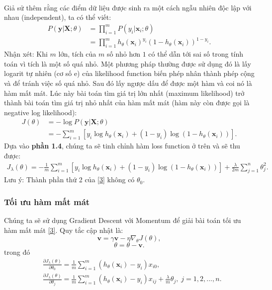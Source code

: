 \documentclass[]{article}
\begin{document}
\\
Giả sử thêm rằng các điểm dữ liệu được sinh ra một cách ngẫu nhiên độc lập với nhau (independent), ta có thể viết:
\begin{align*}
	P(\mathbf{y}|\mathbf{X}; \theta) &= \prod_{i=1}^m P(y_i| \mathbf{x}_i; \theta) \\
	&= \prod_{i=1}^m h_\theta(\textbf{x}_i)^{y_i}(1 - h_\theta(\textbf{x}_i))^{1- y_i}.
\end{align*}
Nhận xét: Khi $m$ lớn, tích của $m$ số nhỏ hơn $1$ có thể dẫn tới sai số trong tính toán vì tích là một số quá nhỏ. Một phương pháp thường được sử dụng đó là lấy logarit tự nhiên (cơ số e) của likelihood function biến phép nhân thành phép cộng và để tránh việc số quá nhỏ. Sau đó lấy ngược dấu để được một hàm và coi nó là hàm mất mát. Lúc này bài toán tìm giá trị lớn nhất (maximum likelihood) trở thành bài toán tìm giá trị nhỏ nhất của hàm mất mát (hàm này còn được gọi là negative log likelihood):
\begin{align*}
	J(\theta) &= -\log P(\mathbf{y}|\mathbf{X};\theta) \\
	&= -\sum_{i=1}^m \left[y_i \log h_\theta(\textbf{x}_i) + (1-y_i) \log (1 - h_\theta(\textbf{x}_i))\right].
\end{align*}
Dựa vào \textbf{phần 1.4}, chúng ta sẽ tinh chỉnh hàm loss function ở trên và sẽ thu được:
\begin{align}\label{3}
	J_\lambda(\theta) = -\frac{1}{m}\sum_{i=1}^m \left[y_i \log h_\theta(\textbf{x}_i) + (1-y_i) \log (1 - h_\theta(\textbf{x}_i))\right]+\frac{\lambda}{2m}\sum_{j=1}^{n}\theta_j^2.
\end{align}
Lưu ý: Thành phần thứ 2 của \eqref{3} không có $\theta_0$.
\subsubsection{Tối ưu hàm mất mát}
Chúng ta sẽ sử dụng Gradient Descent với Momentum để giải bài toán tối ưu hàm mất mát \eqref{3}. Quy tắc cập nhật là:
$$\textbf{v} = \gamma\textbf{v} - \eta \nabla_{\theta} J(\theta),$$
$$\theta=\theta-\textbf{v}.$$
trong đó
\begin{align*}
	&\frac{\partial J_\lambda(\theta)}{\partial \theta_0}=\frac{1}{m}\sum_{i=1}^m\left(h_\theta(\textbf{x}_i)-y_i\right)x_{i0},\\
	&\frac{\partial J_\lambda(\theta)}{\partial \theta_j}=\frac{1}{m}\sum_{i=1}^m\left(h_\theta(\textbf{x}_i)-y_i\right)x_{ij}+\frac{\lambda}{m}\theta_j, \; j=1, 2, ..., n.
\end{align*}
\newpage
\end{document}
